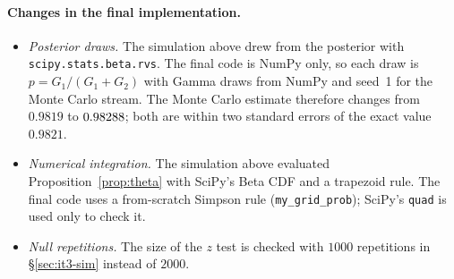 \documentclass[11pt]{article}
\theoremstyle{definition}
\theoremstyle{remark}
\begin{document}
\paragraph{Changes in the final implementation.}
\begin{itemize}[nosep]
\item \emph{Posterior draws.} The simulation above drew from the posterior with \texttt{scipy.stats.beta.rvs}. The
  final code is NumPy only, so each draw is $p=G_1/(G_1+G_2)$ with Gamma draws from NumPy and seed~1 for the Monte
  Carlo stream. The Monte Carlo estimate therefore changes from $0.9819$ to $0.98288$; both are within two
  standard errors of the exact value $0.9821$.
\item \emph{Numerical integration.} The simulation above evaluated Proposition~\ref{prop:theta} with SciPy's Beta CDF
  and a trapezoid rule. The final code uses a from-scratch Simpson rule (\texttt{my\_grid\_prob}); SciPy's
  \texttt{quad} is used only to check it.
\item \emph{Null repetitions.} The size of the $z$ test is checked with $1000$ repetitions in \S\ref{sec:it3-sim}
  instead of $2000$.
\end{itemize}

\end{document}
